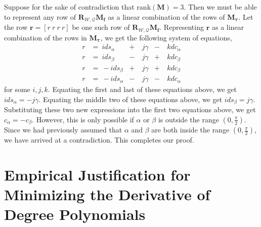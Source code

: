 Suppose for the sake of contradiction that $\mathrm{rank}(\mathbf{M})=3$.
Then we must be able to represent any row of $\mathbf{R}_{\mathcal{W},\mathcal{Q}} \mathbf{M}_{\mathbf{f}}$ as a linear combination of the rows of $\mathbf{M}_{\mathbf{\tau}}$.
Let the row $\mathbf{r} =[r ~ r ~ r ~ r]$ be one such row of $\mathbf{R}_{\mathcal{W},\mathcal{Q}} \mathbf{M}_{\mathbf{f}}$.
Representing $\mathbf{r}$ as a linear combination of the rows in $\mathbf{M}_{\mathbf{\tau}}$, we get the following system of equations,
%
\begin{equation}
\begin{aligned}
r & = ~   i ds_{\alpha} & + & ~ j \gamma & - & ~ k dc_{\alpha} \\
r & = ~   i ds_{\beta}  & - & ~ j \gamma & + & ~ k dc_{\beta}  \\
r & = ~ - i ds_{\beta}  & + & ~ j \gamma & + & ~ k dc_{\beta}  \\
r & = ~ - i ds_{\alpha} & - & ~ j \gamma & - & ~ k dc_{\alpha}
\end{aligned}
\end{equation}
%
for some $i,j,k$.
Equating the first and last of these equations above, we get $i ds_{\alpha} = - j \gamma $.
Equating the middle two of these equations above, we get $i ds_{\beta} =  j \gamma $.
Substituting these two new expressions into the first two equations above, we get $c_{\alpha} = - c_{\beta}$.
However, this is only possible if $\alpha$ or $\beta$ is outside the range $(0,\frac{\pi}{2})$.
Since we had previously assumed that $\alpha$ and $\beta$ are both inside the range $(0,\frac{\pi}{2})$, we have arrived at a contradiction.
This completes our proof.

\section{Empirical Justification for Minimizing the  Derivative of  Degree Polynomials}

